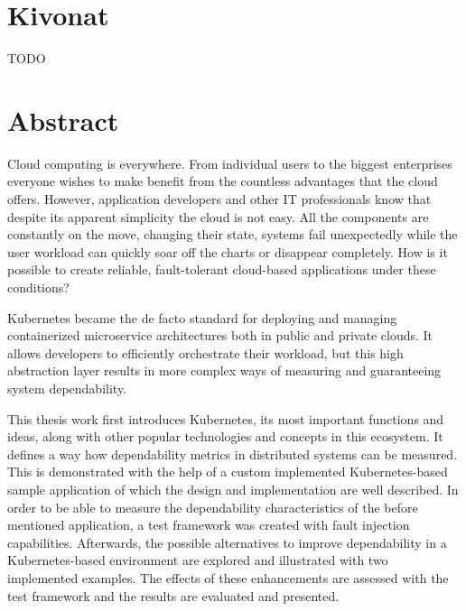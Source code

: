 \setcounter{page}{1}

\selecthungarian

\chapter*{Kivonat}

TODO


\vfill
\selectenglish


\chapter*{Abstract}

Cloud computing is everywhere. From individual users to the biggest enterprises everyone wishes to make benefit from the countless advantages that the cloud offers. However, application developers and other IT professionals know that despite its apparent simplicity the cloud is not easy. All the components are constantly on the move, changing their state, systems fail unexpectedly while the user workload can quickly soar off the charts or disappear completely. How is it possible to create reliable, fault-tolerant cloud-based applications under these conditions?

Kubernetes became the de facto standard for deploying and managing containerized microservice architectures both in public and private clouds. It allows developers to efficiently orchestrate their workload, but this high abstraction layer results in more complex ways of measuring and guaranteeing system dependability.

This thesis work first introduces Kubernetes, its most important functions and ideas, along with other popular technologies and concepts in this ecosystem. It defines a way how dependability metrics in distributed systems can be measured. This is demonstrated with the help of a custom implemented Kubernetes-based sample application of which the design and implementation are well described. In order to be able to measure the dependability characteristics of the before mentioned application, a test framework was created with fault injection capabilities. Afterwards, the possible alternatives to improve dependability in a Kubernetes-based environment are explored and illustrated with two implemented examples. The effects of these enhancements are assessed with the test framework and the results are evaluated and presented.

